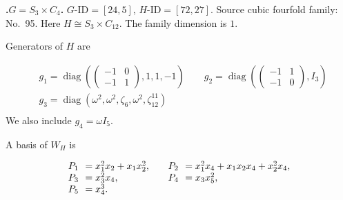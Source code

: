 \documentclass[12pt]{amsart}
\makeatletter
\numberwithin{equation}{section}
\theoremstyle{plain}
\theoremstyle{definition}
\theoremstyle{remark}
\DeclareMathOperator{\diag}{diag}
\newcommand{\PBasisLabel}[1]{\mathrlap{P_{#1}}\phantom{P_{99}}}
\newenvironment{SecEightAlignedBasis}[1]{%
  \begingroup\renewcommand{\arraystretch}{1.18}%
  \[\begin{array}{@{}#1@{}}%
}{\end{array}\]\endgroup}
\newenvironment{familydisplay}{%
  \begingroup
  \setlength{\arraycolsep}{1.35pt}%
  \renewcommand{\arraystretch}{0.96}%
  \setlength{\jot}{2pt}%
}{\endgroup}
\newcommand{\smat}[1]{\left(\begin{smallmatrix}#1\end{smallmatrix}\right)}
\makeatother
\begin{document}
\par{}\medskip\noindent\textbf{.\enspace $G=S_3\times C_4$.}\label{fam:threefold-no-23}
$G\text{-ID}=[24,5]$, $H\text{-ID}=[72,27]$.
Source cubic fourfold family: No.~95.  Here
$H\cong S_3\times C_{12}$.
The family dimension is $1$.
\par\smallskip\noindent Generators of $H$ are\par\nopagebreak
\begin{familydisplay}
\begin{align*}
&g_{1}=\diag\!\left(\smat{-1&0\\-1&1},1,1,-1\right)
\qquad g_{2}=\diag\!\left(\smat{-1&1\\-1&0},I_3\right)\\
&g_{3}=\diag(\omega^2,\omega^2,\zeta_6,\omega^2,\zeta_{12}^{11})\\
\end{align*}
\end{familydisplay}
\noindent We also include $g_{4}=\omega I_5$.
\par\smallskip\noindent A basis of $W_H$ is\par\nopagebreak
\begin{familydisplay}
\begin{SecEightAlignedBasis}{l@{\qquad}l}
\PBasisLabel{1}=x_{1}^{2}x_{2}+x_{1}x_{2}^{2}, & \PBasisLabel{2}=x_{1}^{2}x_{4}+x_{1}x_{2}x_{4}+x_{2}^{2}x_{4},\\
\PBasisLabel{3}=x_{3}^{2}x_{4}, & \PBasisLabel{4}=x_{3}x_{5}^{2},\\
\multicolumn{2}{@{}l@{}}{\PBasisLabel{5}=x_{4}^{3}.}
\end{SecEightAlignedBasis}
\end{familydisplay}
\end{document}
